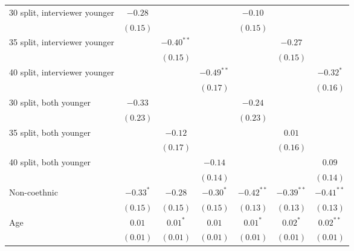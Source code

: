 \begin{table}
\begin{center}
\begin{threeparttable}
\begin{tabular}{l c c c c c c}
30 split, interviewer younger   & $-0.28$       &               &               & $-0.10$       &               &               \\
                                & $(0.15)$      &               &               & $(0.15)$      &               &               \\
35 split, interviewer younger   &               & $-0.40^{**}$  &               &               & $-0.27$       &               \\
                                &               & $(0.15)$      &               &               & $(0.15)$      &               \\
40 split, interviewer younger   &               &               & $-0.49^{**}$  &               &               & $-0.32^{*}$   \\
                                &               &               & $(0.17)$      &               &               & $(0.16)$      \\
30 split, both younger          & $-0.33$       &               &               & $-0.24$       &               &               \\
                                & $(0.23)$      &               &               & $(0.23)$      &               &               \\
35 split, both younger          &               & $-0.12$       &               &               & $0.01$        &               \\
                                &               & $(0.17)$      &               &               & $(0.16)$      &               \\
40 split, both younger          &               &               & $-0.14$       &               &               & $0.09$        \\
                                &               &               & $(0.14)$      &               &               & $(0.14)$      \\
Non-coethnic                    & $-0.33^{*}$   & $-0.28$       & $-0.30^{*}$   & $-0.42^{**}$  & $-0.39^{**}$  & $-0.41^{**}$  \\
                                & $(0.15)$      & $(0.15)$      & $(0.15)$      & $(0.13)$      & $(0.13)$      & $(0.13)$      \\
Age                             & $0.01$        & $0.01^{*}$    & $0.01$        & $0.01^{*}$    & $0.02^{*}$    & $0.02^{**}$   \\
                                & $(0.01)$      & $(0.01)$      & $(0.01)$      & $(0.01)$      & $(0.01)$      & $(0.01)$      \\

\end{tabular}
\end{threeparttable}
\end{center}
\end{table}
